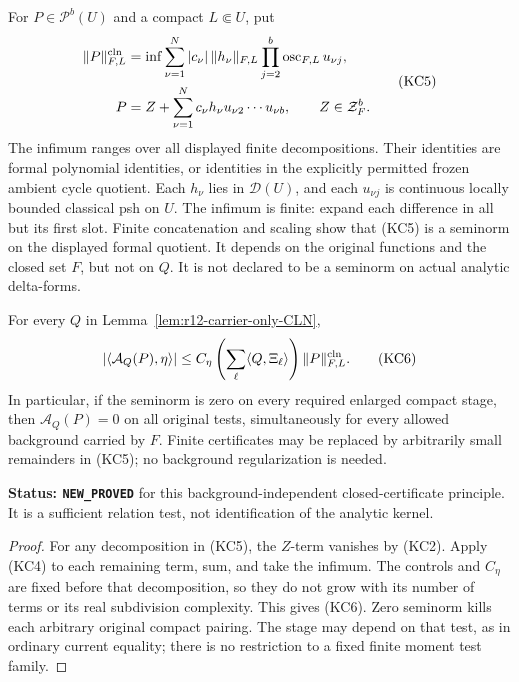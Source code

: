 \begin{definition}
\label{def:r12-carrier-cln-seminorm}
For \(P\in\mathcal P^b(U)\) and a compact \(L\Subset U\), put
\[
 \begin{aligned}
 \|P\|^{\rm cln}_{F,L}
  &=\inf
       \sum_{\nu=1}^N |c_\nu|\,\|h_\nu\|_{F,L}
                  \prod_{j=2}^b\operatorname{osc}_{F,L}u_{\nu j},\\
 P&=Z+\sum_{\nu=1}^N c_\nu h_\nu u_{\nu2}\cdots u_{\nu b},
             \qquad Z\in\mathcal Z_F^b .
 \end{aligned}
 \tag{KC5}
\]
The infimum ranges over all displayed finite decompositions.
Their identities are formal polynomial identities,
or identities in the explicitly permitted frozen ambient cycle
quotient. Each \(h_\nu\) lies in \(\mathcal D(U)\), and each
\(u_{\nu j}\) is continuous locally bounded classical psh on \(U\).
The infimum is finite: expand each difference in all but its
first slot. Finite concatenation and scaling show that (KC5)
is a seminorm on the displayed formal quotient. It depends on
the original functions and the closed set \(F\), but not on \(Q\).
It is not declared to be a seminorm on actual analytic delta-forms.
\end{definition}

\begin{theorem}
\label{thm:r12-carrier-cln-zero-certificate}
For every \(Q\) in Lemma~\ref{lem:r12-carrier-only-CLN},
\[
          |\langle\mathcal A_Q(P),\eta\rangle|
          \le C_\eta\left(\sum_\ell\langle Q,\Xi_\ell\rangle\right)
                                      \|P\|^{\rm cln}_{F,L}.
 \tag{KC6}
\]
In particular, if the seminorm is zero on every required enlarged
compact stage, then \(\mathcal A_Q(P)=0\) on all original tests,
simultaneously for every allowed background carried by \(F\).
Finite certificates may be replaced by arbitrarily small
remainders in (KC5); no background regularization is needed.
\end{theorem}

\noindent\textbf{Status: \texttt{NEW\_PROVED}} for this
background-independent closed-certificate principle. It is a
sufficient relation test, not identification of the analytic kernel.

\begin{proof}
For any decomposition in (KC5), the \(Z\)-term vanishes by (KC2).
Apply (KC4) to each remaining term, sum, and take the infimum.
The controls and \(C_\eta\) are fixed before that decomposition,
so they do not grow with its number of terms or its real
subdivision complexity. This gives (KC6). Zero seminorm kills
each arbitrary original compact pairing. The stage may depend
on that test, as in ordinary current equality; there is no
restriction to a fixed finite moment test family.
\end{proof}

